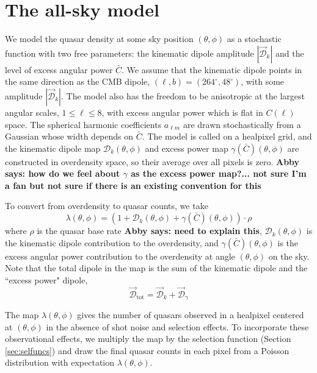 \documentclass[modern]{aastex631}
\newcommand{\abby}[1]{\textbf{Abby says: #1}}
\begin{document}
\section{The all-sky model}
\label{sec:model}

We model the quasar density at some sky position $(\theta,\phi)$ as a stochastic function with two free parameters: the kinematic dipole amplitude $|\vec{\mathcal{D}}_k|$ and the level of excess angular power $\bar C$.
We assume that the kinematic dipole points in the same direction as the CMB dipole, $(\ell,b)=(264^\circ,48^\circ)$, with some amplitude $|\vec{\mathcal{D}}_k|$.
The model also has the freedom to be anisotropic at the largest angular scales, $1\le\ell\le 8$, with excess angular power which is flat in $C(\ell)$ space.
The spherical harmonic coefficients $a_{\ell m}$ are drawn stochastically from a Gaussian whose width depends on $\bar C$.
The model is called on a healpixel grid, and the kinematic dipole map $\mathcal{D}_k(\theta,\phi)$ and excess power map $\gamma(\bar C)(\theta,\phi)$ are constructed in overdensity space, so their average over all pixels is zero.
\abby{how do we feel about $\gamma$ as the excess power map?... not sure I'm a fan but not sure if there is an existing convention for this}

To convert from overdensity to quasar counts, we take
\begin{equation}
    \lambda(\theta,\phi) = (1 + \mathcal{D}_k(\theta,\phi) + \gamma(\bar C)(\theta, \phi)) \cdot \rho
\end{equation}
where $\rho$ is the quasar base rate \abby{need to explain this}, $\mathcal{D}_k(\theta,\phi)$ is the kinematic dipole contribution to the overdensity, and $\gamma(\bar C)(\theta,\phi)$ is the excess angular power contribution to the overdensity at angle $(\theta,\phi)$ on the sky.
Note that the total dipole in the map is the sum of the kinematic dipole and the ``excess power" dipole,
\begin{equation}
    \vec{\mathcal{D}}_\mathrm{tot}=\vec{\mathcal{D}}_k + \vec{\mathcal{D}}_\gamma 
\end{equation}

The map $\lambda(\theta,\phi)$ gives the number of quasars observed in a healpixel centered at $(\theta,\phi)$ in the absence of shot noise and selection effects.
To incorporate these observational effects, we multiply the map by the selection function (Section \ref{sec:selfuncs}) and draw the final quasar counts in each pixel from a Poisson distribution with expectation $\lambda(\theta,\phi)$.
\end{document}
